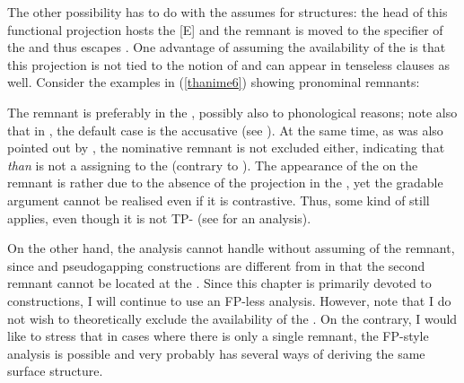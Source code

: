 The other possibility has to do with the  \citet{merchant2001} assumes for  structures: the head of this functional projection hosts the  [E] and the remnant is moved to the specifier of the  and thus escapes . One advantage of assuming the availability of the  is that this projection is not tied to the notion of  and can appear in tenseless clauses as well. Consider the examples in (\ref{thanime6}) showing pronominal remnants:

\ea \label{thanime6}
 \label{thani}
 \label{thanme}
\z
\z

The remnant is preferably in the , possibly also to phonological reasons; note also that in , the default case is the accusative (see \citealt{schuetze2001}). At the same time, as was also pointed out by \citet[618]{bhatttakahashi2011}, the nominative remnant is not excluded either, indicating that \textit{than} is not a  assigning  to the  (contrary to \citealt{hankamer1973}). The appearance of the  on the remnant is rather due to the absence of the  projection in the , yet the gradable argument cannot be realised even if it is contrastive. Thus, some kind of  still applies, even though it is not TP- (see \citealt{bacskaiatkari2014alh} for an analysis).

On the other hand, the  analysis cannot handle  without assuming  of the remnant, since  and pseudogapping constructions are different from  in that the second remnant cannot be located at the . Since this chapter is primarily devoted to  constructions, I will continue to use an FP-less analysis. However, note that I do not wish to theoretically exclude the availability of the . On the contrary, I would like to stress that in cases where there is only a single remnant, the FP-style  analysis is possible and  very probably has several ways of deriving the same surface structure.

